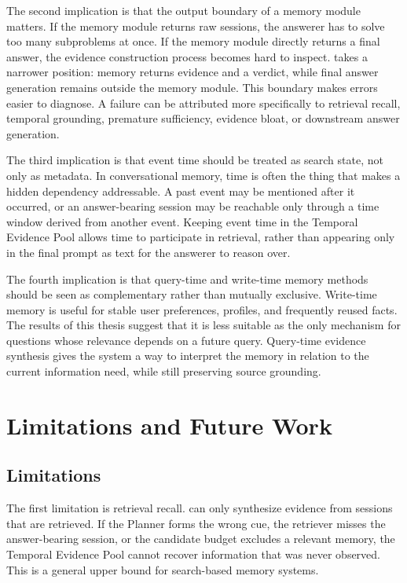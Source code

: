 The second implication is that the output boundary of a memory module matters.
If the memory module returns raw sessions, the answerer has to solve too many
subproblems at once. If the memory module directly returns a final answer, the
evidence construction process becomes hard to inspect. \sys{} takes a narrower
position: memory returns evidence and a verdict, while final answer generation
remains outside the memory module. This boundary makes errors easier to
diagnose. A failure can be attributed more specifically to retrieval recall,
temporal grounding, premature sufficiency, evidence bloat, or downstream answer
generation.

The third implication is that event time should be treated as search state, not
only as metadata. In conversational memory, time is often the thing that makes a
hidden dependency addressable. A past event may be mentioned after it occurred,
or an answer-bearing session may be reachable only through a time window
derived from another event. Keeping event time in the Temporal Evidence Pool
allows time to participate in retrieval, rather than appearing only in the
final prompt as text for the answerer to reason over.

The fourth implication is that query-time and write-time memory methods should
be seen as complementary rather than mutually exclusive. Write-time memory is
useful for stable user preferences, profiles, and frequently reused facts. The
results of this thesis suggest that it is less suitable as the only mechanism
for questions whose relevance depends on a future query. Query-time evidence
synthesis gives the system a way to interpret the memory in relation to the
current information need, while still preserving source grounding.

\section{Limitations and Future Work}
\label{sec:conclusion-limitations-future}

\subsection{Limitations}
\label{subsec:conclusion-limitations}

The first limitation is retrieval recall. \sys{} can only synthesize evidence
from sessions that are retrieved. If the Planner forms the wrong cue, the
retriever misses the answer-bearing session, or the candidate budget excludes a
relevant memory, the Temporal Evidence Pool cannot recover information that was
never observed. This is a general upper bound for search-based memory systems.

